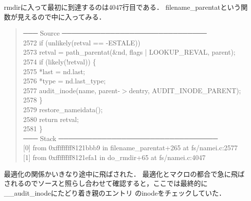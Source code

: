 rmdirに入って最初に到達するのは4047行目である．
filename\_parentatという関数が見えるので中に入ってみる．
\begin{quote}
─── Source ──────────────────────────────
\\
 2572      if (unlikely(retval == -ESTALE)) \\
 2573          retval = path\_parentat(\&nd, flags | LOOKUP\_REVAL, parent); \\
 2574      if (likely(!retval)) \{ \\
 2575          *last = nd.last; \\
 2576          *type = nd.last\_type; \\
 2577          audit\_inode(name, parent-$>$dentry, AUDIT\_INODE\_PARENT); \\
 2578      \} \\
 2579      restore\_nameidata(); \\
 2580      return retval; \\
 2581  \} \\
─── Stack ─────────────────────────────────
\\
{[0]} from 0xffffffff8121bbb9 in filename\_parentat+265 at fs/namei.c:2577 \\
{[1]} from 0xffffffff8121efa1 in do\_rmdir+65 at fs/namei.c:4047
\end{quote}
最適化の関係かいきなり途中に飛ばされた．
最適化とマクロの都合で急に飛ばされるのでソースと照らし合わせて確認すると，ここでは最終的に\_\_audit\_inodeにたどり着き親のエントリ
のinodeをチェックしていた．

